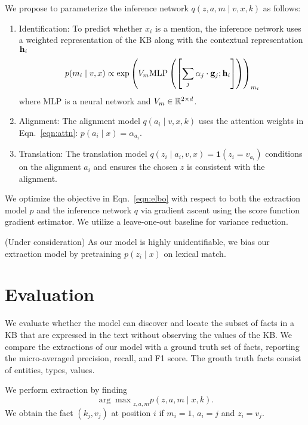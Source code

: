 \documentclass[12pt]{article}
\begin{document}
We propose to parameterize the inference network $q(z,a,m\mid v,x,k)$ as follows:
\begin{enumerate}
\item Identification: To predict whether $x_i$ is a mention,
    the inference network uses a weighted representation of the KB
    along with the contextual representation $\mathbf{h}_i$
    \begin{equation}
    p(m_i \mid v,x) \propto
    \exp\left(V_m
    \textrm{MLP}\left(\left[\sum_j \alpha_j \cdot \mathbf{g}_j; \mathbf{h}_i\right]\right)\right)_{m_i}
    \end{equation}
    where MLP is a neural network and $V_m \in \mathbb{R}^{2 \times d}$.
\item Alignment: The alignment model $q(a_i \mid v,x,k)$
    uses the attention weights in Eqn.~\ref{eqn:attn}:
    $p(a_i \mid x) = \alpha_{a_i}$.
\item Translation: The translation model
    $q(z_i \mid a_i,v,x) = \mathbf{1}(z_i = v_{a_i})$
    conditions on the alignment $a_i$ and ensures the chosen $z$ is consistent
    with the alignment. 
\end{enumerate}

We optimize the objective in Eqn.~\ref{eqn:elbo}
with respect to both the extraction model $p$ and the inference network $q$
via gradient ascent using the score function gradient estimator.
We utilize a leave-one-out baseline for variance reduction.

(Under consideration)
As our model is highly unidentifiable,
we bias our extraction model by pretraining $p(z_i \mid x)$ on lexical match.

\section{Evaluation}
We evaluate whether the model can discover
and locate the subset of facts in a KB that are expressed in the text
without observing the values of the KB.
We compare the extractions of our model with a ground truth set of facts,
reporting the micro-averaged precision, recall, and F1 score.
The grouth truth facts consist of entities, types, values.

We perform extraction by finding
$${\arg\max}_{z,a,m} p(z,a,m\mid x,k).$$
We obtain the fact $(k_j, v_j)$ at position $i$ if $m_i=1$,
$a_i = j$ and $z_i = v_j$.
\end{document}
